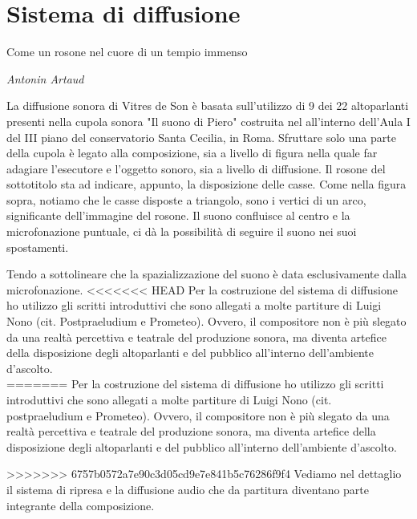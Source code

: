 
\chapter{Sistema di diffusione}
\label{chp:Sistema di diffusione}

\epigraph{Come un rosone nel cuore di un tempio immenso}{\textit{Antonin Artaud}}

La diffusione sonora di Vitres de Son è basata sull'utilizzo di 9 dei 22 altoparlanti presenti nella cupola sonora "Il suono di Piero" costruita nel all'interno dell'Aula I del III piano del conservatorio Santa Cecilia, in Roma. Sfruttare solo una parte della cupola è legato alla composizione, sia a livello di figura nella quale far adagiare l'esecutore e l'oggetto sonoro, sia a livello di diffusione. Il rosone del sottotitolo sta ad indicare, appunto, la disposizione delle casse. Come nella figura sopra, notiamo che le casse disposte a triangolo, sono i vertici di un arco, significante dell'immagine del rosone. Il suono confluisce al centro e la microfonazione puntuale, ci dà la possibilità di seguire il suono nei suoi spostamenti.

Tendo a sottolineare che la spazializzazione del suono è data esclusivamente dalla microfonazione.
<<<<<<< HEAD
Per la costruzione del sistema di diffusione ho utilizzo gli scritti introduttivi che sono allegati a molte partiture di Luigi Nono (cit. Postpraeludium e Prometeo). Ovvero, il compositore non è più slegato da una realtà percettiva e teatrale del produzione sonora, ma diventa artefice della disposizione degli altoparlanti e del pubblico all'interno dell'ambiente d'ascolto. \\
=======
Per la costruzione del sistema di diffusione ho utilizzo gli scritti introduttivi che sono allegati a molte partiture di Luigi Nono (cit. postpraeludium e Prometeo). Ovvero, il compositore non è più slegato da una realtà percettiva e teatrale del produzione sonora, ma diventa artefice della disposizione degli altoparlanti e del pubblico all'interno dell'ambiente d'ascolto.

>>>>>>> 6757b0572a7e90c3d05cd9e7e841b5c76286f9f4
Vediamo nel dettaglio il sistema di ripresa e la diffusione audio che da partitura diventano parte integrante della composizione.

